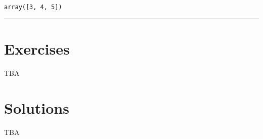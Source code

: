 \documentclass[10pt]{scrartcl}
\makeatletter
\newcommand{\boxspacing}{\kern\kvtcb@left@rule\kern\kvtcb@boxsep}
\newcommand{\prompt}[4]{
        {\ttfamily\llap{{\color{#2}[#3]:\hspace{3pt}#4}}\vspace{-\baselineskip}}
    }
\makeatother
\begin{document}
            \begin{tcolorbox}[breakable, size=fbox, boxrule=.5pt, pad at break*=1mm, opacityfill=0]
\prompt{Out}{outcolor}{71}{\boxspacing}
\begin{Verbatim}[commandchars=\\\{\}]
array([3, 4, 5])
\end{Verbatim}
\end{tcolorbox}
        
    \begin{center}\rule{0.5\linewidth}{0.5pt}\end{center}

\hypertarget{exercises}{%
\section{Exercises}\label{exercises}}

TBA

    \hypertarget{solutions}{%
\section{Solutions}\label{solutions}}

TBA


    
    
    
\end{document}
